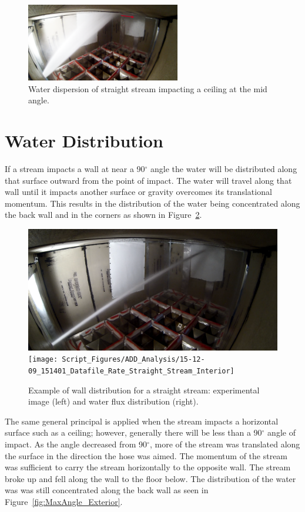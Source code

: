 \documentclass[12pt,oneside]{book}
\begin{document}
\begin{figure}[!ht]
\centering
\includegraphics[width=0.6\textwidth]{Figures/Water_Distribution/Nozzle_Directions/Interior_MidCeiling_Fog_Arrows} 
\caption[Water Dispersion Straight Stream Mid Angle Ceiling]{Water dispersion of straight stream impacting a ceiling at the mid angle.}
\label{fig:MinAngleCeilingFogImpact}
\end{figure}


\section{Water Distribution}
\label{sec:water_dist}

If a stream impacts a wall at near a 90$^{\circ}$ angle the water will be distributed along that surface outward from the point of impact. The water will travel along that wall until it impacts another surface or gravity overcomes its translational momentum. This results in the distribution of the water being concentrated along the back wall and in the corners as shown in Figure~\ref{fig:Interior_Atwall_Example}.

\begin{figure}[!ht]
\centering
\includegraphics[height=0.25\textwidth]{Figures/Water_Distribution/Nozzle_Directions/Interior_MaxAngleWall_SS_Inside_2} 
\texttt{[image: Script\_Figures/ADD\_Analysis/15-12-09\_151401\_Datafile\_Rate\_Straight\_Stream\_Interior]}
\caption[Example of At Wall Distribution]{Example of wall distribution for a straight stream: experimental image (left) and water flux distribution (right).}
\label{fig:Interior_Atwall_Example}
\end{figure}

The same general principal is applied when the stream impacts a horizontal surface such as a ceiling; however, generally there will be less than a 90$^{\circ}$ angle of impact. As the angle decreased from 90$^{\circ}$, more of the stream was translated along the surface in the direction the hose was aimed. The momentum of the stream was sufficient to carry the stream horizontally to the opposite wall. The stream broke up and fell along the wall to the floor below. The distribution of the water was was still concentrated along the back wall as seen in Figure~\ref{fig:MaxAngle_Exterior}.
\end{document}
